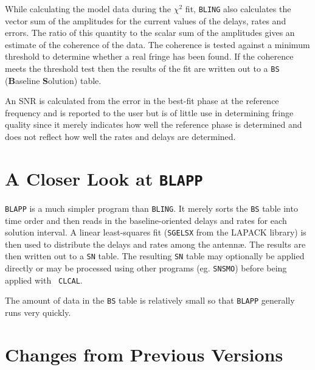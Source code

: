 While calculating the model data during the $\chi^2$ fit, {\tt BLING}
also calculates the vector sum of the amplitudes for the current
values of the delays, rates and errors.  The ratio of this quantity
to the scalar sum of the amplitudes gives an estimate of the coherence
of the data.  The coherence is tested against a minimum threshold to
determine whether a real fringe has been found.  If the coherence
meets the threshold test then the results of the fit are written out to
a {\tt BS} ({\bf B}aseline {\bf S}olution) table.

An SNR is calculated from the error in the best-fit phase at the
reference frequency and is reported to the user but is of little use
in determining fringe quality since it merely indicates how well the
reference phase is determined and does not reflect how well the rates
and delays are determined.

\section{A Closer Look at {\tt BLAPP}}

{\tt BLAPP} is a much simpler program than {\tt BLING}.  It merely
sorts the {\tt BS} table into time order and then reads in the
baseline-oriented delays and rates for each solution interval.  A
linear least-squares fit ({\tt SGELSX} from the LAPACK library) is
then used to distribute the delays and rates among the antenn\ae.
The results are then written out to a {\tt SN} table.  The resulting
{\tt SN} table may optionally be applied directly or may be processed
using other programs (eg. {\tt SNSMO}) before being applied with {\tt
CLCAL}.

The amount of data in the {\tt BS} table is relatively small so that
{\tt BLAPP} generally runs very quickly.

\appendix

\section{Changes from Previous Versions}

